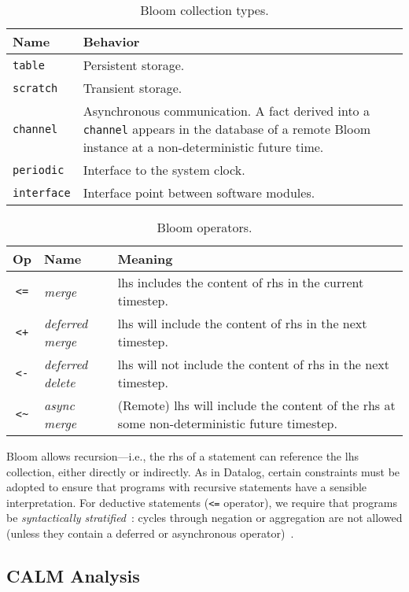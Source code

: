\begin{table}[t]
\centering
\begin{tabular}{|l|p{2.32in}|}
\hline
\textbf{Name} & \textbf{Behavior }\\
\hline
\texttt{table} & Persistent storage.\\
\texttt{scratch} & Transient storage.\\
\texttt{channel} & Asynchronous communication. A fact derived into a \texttt{channel} appears in the
database of a remote Bloom instance at a non-deterministic future time.\\
\texttt{periodic} & Interface to the system clock.\\
\texttt{interface} & Interface point between software modules.\\
\hline
\end{tabular}
\caption{Bloom collection types.}
\label{tbl:bloom-collections}
\end{table}
\begin{table}
\begin{tabular}{|c|l|p{1.85in}|}
\hline
\textbf{Op} & \textbf{Name} & \textbf{Meaning} \\
\hline
\verb|<=| & \emph{merge} & lhs includes the content of rhs in the
current timestep. \\
\hline
\verb|<+| & \emph{deferred merge} & lhs will include the content of rhs in the
next timestep. \\
\hline
\verb|<-| & \emph{deferred delete} & lhs will not include the content of rhs
in the next timestep. \\
\hline
\verb|<~| & \emph{async merge} & (Remote) lhs will include the content of the
rhs at some non-deterministic future timestep. \\
\hline
\end{tabular}
\caption{Bloom operators.}
\label{tbl:bloom-ops}
\end{table}

Bloom allows recursion---i.e., the rhs of a statement can reference the lhs
collection, either directly or indirectly. As in Datalog, certain constraints
must be adopted to ensure that programs with recursive statements have a
sensible interpretation. For deductive statements (\verb+<=+ operator), we
require that programs be \emph{syntactically stratified}~\cite{Apt1988}: cycles
through negation or aggregation are not allowed (unless they contain a deferred
or asynchronous operator)~\cite{dedalus}.

\subsection{CALM Analysis}
\label{sec:bg-calm}

